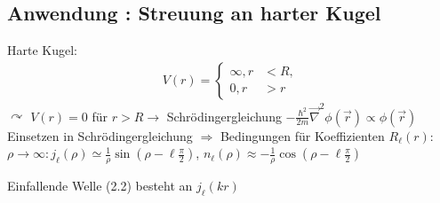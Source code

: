 \subsection{Anwendung : Streuung an harter Kugel} 
	Harte Kugel:
	\begin{align*}
	V (r) =
	\left\{
	\begin{aligned}
	\infty , r &< R, \\
	0 , r &> r
	\end{aligned}
	\right.
	\end{align*}
	$\curvearrowright$ 
	$V(r)= 0$ für $r>R \rightarrow$ Schrödingergleichung $-\frac{\hbar^2}{2m} \vec{\nabla}^2 \phi(\vec{r})
	\propto \phi(\vec{r})$
	Einsetzen in Schrödingergleichung $\Rightarrow$ Bedingungen für Koeffizienten $R_\ell(r)$:
	$\rho \rightarrow \infty : j_\ell (\rho) \simeq \frac{1}{\rho} \sin(\rho-\ell\frac{\pi}{2})$,
	$n_\ell (\rho) \approx -\frac{1}{\rho}  \cos(\rho-\ell\frac{\pi}{2})$
	
	Einfallende Welle (2.2) besteht an $j_\ell (kr)$
	
